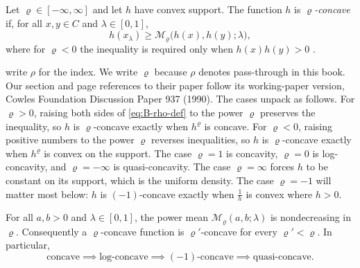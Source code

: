 \begin{definition}\label{def:B-rhoconcave}
Let $\varrho \in [-\infty, \infty]$ and let $h$ have convex support. The function $h$ is
\emph{$\varrho$-concave} if, for all $x, y \in C$ and $\lambda \in [0, 1]$,
\begin{equation}\label{eq:B-rho-def}
  h(x_\lambda) \geq \mathcal{M}_\varrho\bigl(h(x), h(y); \lambda\bigr),
\end{equation}
where for $\varrho < 0$ the inequality is required only when $h(x)h(y) > 0$
\citep[Section 3]{CaplinNalebuff1991}.
\end{definition}

\citet{CaplinNalebuff1991} write $\rho$ for the index. We write $\varrho$ because $\rho$ denotes pass-through in
this book. Our section and page references to their paper follow its working-paper version, Cowles Foundation
Discussion Paper 937 (1990). The cases unpack as follows. For $\varrho > 0$, raising both sides of \eqref{eq:B-rho-def} to the
power $\varrho$ preserves the inequality, so $h$ is $\varrho$-concave exactly when $h^\varrho$ is concave. For
$\varrho < 0$, raising positive numbers to the power $\varrho$ reverses inequalities, so $h$ is $\varrho$-concave
exactly when $h^\varrho$ is convex on the support. The case $\varrho = 1$ is concavity, $\varrho = 0$ is
log-concavity, and $\varrho = -\infty$ is quasi-concavity. The case $\varrho = \infty$ forces $h$ to be constant on
its support, which is the uniform density. The case $\varrho = -1$ will matter most below: $h$ is
$(-1)$-concave exactly when $\frac{1}{h}$ is convex where $h > 0$.

\begin{lemma}\label{lem:B-rho-hierarchy}
For all $a, b > 0$ and $\lambda \in [0, 1]$, the power mean $\mathcal{M}_\varrho(a, b; \lambda)$ is nondecreasing in
$\varrho$. Consequently a $\varrho$-concave function is $\varrho'$-concave for every $\varrho' < \varrho$. In particular,
\[
  \text{concave} \implies \text{log-concave} \implies \text{$(-1)$-concave} \implies \text{quasi-concave}.
\]
\end{lemma}

